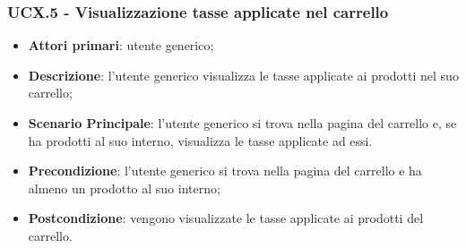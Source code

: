 \subsubsection{UCX.5 - Visualizzazione tasse applicate nel carrello}
\begin{itemize}
\item \textbf{Attori primari}: utente generico;
\item \textbf{Descrizione}: l'utente generico visualizza le tasse applicate ai prodotti nel suo carrello;
\item \textbf{Scenario Principale}: l'utente generico si trova nella pagina del carrello e, se ha prodotti al suo interno, visualizza le tasse applicate ad essi.
\item \textbf{Precondizione}: l'utente generico si trova nella pagina del carrello e ha almeno un prodotto al suo interno;
\item \textbf{Postcondizione}: vengono visualizzate le tasse applicate ai prodotti del carrello.
\end{itemize}




